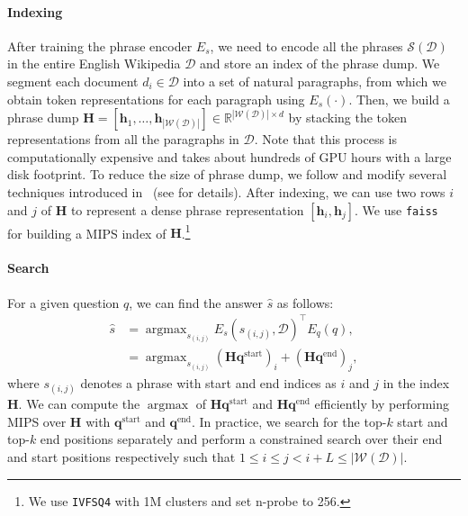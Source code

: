 \documentclass[11pt,a4paper]{article}
\newcommand{\documentset}{\mathcal{D}}
\newcommand{\phraseset}{\mathcal{S}(\mathcal{D})}
\newcommand{\wordset}{\mathcal{W}(\mathcal{D})}
\newcommand{\phrasedump}{\mf{H}}
\newcommand\mf[1]{\mathbf{#1}}
\DeclareMathOperator*{\argmax}{argmax}
\begin{document}
\paragraph{Indexing}
After training the phrase encoder $E_s$, we need to encode all the phrases $\phraseset$ in the entire English Wikipedia $\documentset$ and store an index of the phrase dump.
We segment each document $d_i \in \documentset$ into a set of natural paragraphs, from which we obtain token representations for each paragraph using $E_s(\cdot)$.
Then, we build a phrase dump $\phrasedump = [\mf{h}_1, \dots, \mf{h}_{|\wordset|}]\in \mathbb{R}^{|\wordset| \times d}$ by stacking the token representations from all the paragraphs in $\documentset$.
Note that this process is computationally expensive and takes about hundreds of GPU hours with a large disk footprint.
To reduce the size of phrase dump, we follow and modify several techniques introduced in~\citet{seo2019real} (see  for details).
After indexing, we can use two rows $i$ and $j$ of $\phrasedump$ to represent a dense phrase representation $[\mf{h}_i, \mf{h}_j]$. We use \texttt{faiss}~\citep{johnson2017billion} for building a MIPS index of $\phrasedump$.\footnote{We use \texttt{IVFSQ4} with 1M clusters and set n-probe to 256.}

\paragraph{Search}
For a given question $q$, we can find the answer $\hat{s}$ as follows:
\vspace{-0.2em}
\begin{equation}\label{eqn:formula}
\begin{split}
    \hat{s} &= \argmax_{s_{(i,j)}} E_s(s_{(i,j)}, \documentset) ^\top E_q(q), \\
&=  \argmax_{s_{(i,j)}} (\phrasedump \mf{q}^\text{start})_i + (\phrasedump \mf{q}^\text{end})_j,
\end{split}
\end{equation}
\noindent where $s_{(i,j)}$ denotes a phrase with start and end indices as $i$ and $j$ in the index $\phrasedump$.
We can compute the $\argmax$ of $\phrasedump \mf{q}^\text{start}$ and $\phrasedump \mf{q}^\text{end}$ efficiently by performing MIPS over $\phrasedump$ with $\mf{q}^\text{start}$ and $\mf{q}^\text{end}$.
In practice, we search for the top-$k$ start and top-$k$ end positions separately and perform a constrained search over their end and start positions respectively such that $1 \leq i \leq j < i+L \leq |\wordset|$.
\end{document}
